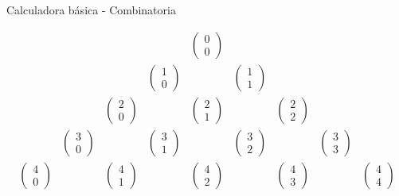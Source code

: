 \documentclass[
  ignorenonframetext,
]{beamer}
\begin{document}
\begin{frame}{Calculadora básica - Combinatoria}
\protect\hypertarget{calculadora-buxe1sica---combinatoria-2}{}

\[\begin{matrix}
&&&&\begin{pmatrix}0\\0\end{pmatrix}&&&&\\
&&&\begin{pmatrix}1\\0\end{pmatrix}&&\begin{pmatrix}1\\1\end{pmatrix}&&&\\
&&\begin{pmatrix}2\\0\end{pmatrix}&&\begin{pmatrix}2\\1\end{pmatrix}&&\begin{pmatrix}2\\2\end{pmatrix}&&\\
&\begin{pmatrix}3\\0\end{pmatrix}&&\begin{pmatrix}3\\1\end{pmatrix}&&\begin{pmatrix}3\\2\end{pmatrix}&&\begin{pmatrix}3\\3\end{pmatrix}&\\
\begin{pmatrix}4\\0\end{pmatrix}&&\begin{pmatrix}4\\1\end{pmatrix}&&\begin{pmatrix}4\\2\end{pmatrix}&&\begin{pmatrix}4\\3\end{pmatrix}&&\begin{pmatrix}4\\4\end{pmatrix}\end{matrix}\]

\end{frame}
\end{document}
